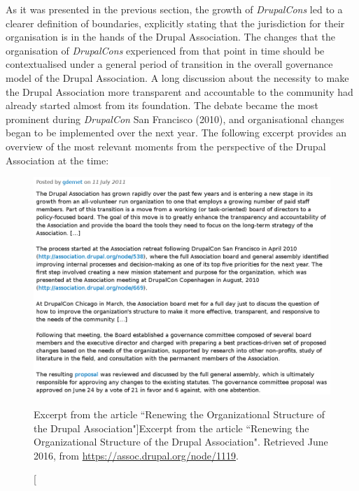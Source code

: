 As it was presented in the previous section, the growth of \textit{DrupalCons} led to a clearer definition of boundaries, explicitly stating that the jurisdiction for their organisation is in the hands of the Drupal Association. The changes that the organisation of \textit{DrupalCons} experienced from that point in time should be contextualised under a general period of transition in the overall governance model of the Drupal Association. A long discussion about the necessity to make the Drupal Association more transparent and accountable to the community had already started almost from its foundation. The debate became the most prominent during \textit{DrupalCon} San Francisco (2010), and organisational changes began to be implemented over the next year. The following excerpt provides an overview of the most relevant moments from the perspective of the Drupal Association at the time:

\begin{figure}[H]
  \centering
\includegraphics[width=\textwidth]{img/quotes_replacement/da_july2011.png}
\caption[Excerpt from the article ``Renewing the Organizational Structure of the Drupal Association"]{Excerpt from the article ``Renewing the Organizational Structure of the Drupal Association". Retrieved  June 2016, from \url{https://assoc.drupal.org/node/1119}.}
\label{quote_renewing_da}
\end{figure}

